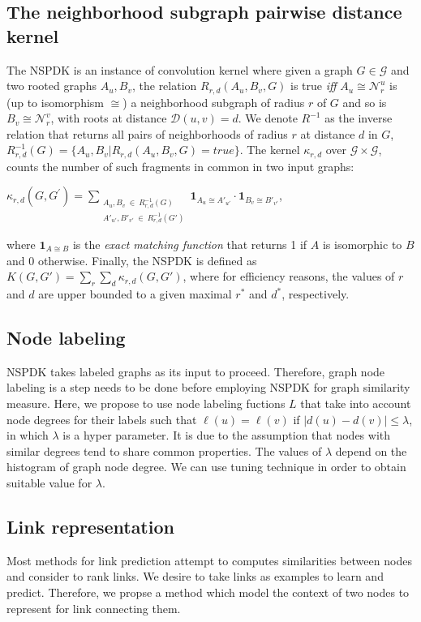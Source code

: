 \documentclass[runningheads,a4paper]{llncs}
\begin{document}
\subsection{The neighborhood subgraph pairwise distance kernel}
The NSPDK \cite{nspdk} is an instance of convolution kernel \cite{convolution-kernel} where given a graph $G \in \mathcal{G}$ and two rooted graphs $A_u, B_v$, the relation $R_{r,d}(A_u, B_v, G)$ is true {\em iff} $A_u \cong \mathcal{N}_r^u$ is (up to isomorphism $\cong$) a neighborhood subgraph of radius $r$ of $G$ and so is $B_v \cong  \mathcal{N}_r^v$, with roots at distance $\mathcal{D}(u,v)= d$. We denote $R^{-1}$ as the inverse relation that returns all pairs of neighborhoods of radius $r$ at distance $d$ in $G$, $R^{-1}_{r,d}(G) = \lbrace A_u, B_v | R_{r,d}(A_u,B_v,G)=true\rbrace$. The kernel $\kappa_{r,d}$ over $\mathcal{G} \times \mathcal{G}$, counts the number of such fragments in common in two input graphs: 
\begin{center}
$\kappa_{r,d}(G,G^{'}) = 
\!\!\!\!\!\!\!\!\!\!\!\! 
\sum\limits_{\substack{A_u, B_v \ \in \ R_{r,d}^{-1}(G) \\ 
{A'}_{u'}, {B'}_{v'} \ \in \ R_{r,d}^{-1}(G')
}} \!\!\!\!\!\!\!\!\!\!\!\!  { { \textbf{1}_{A_{u} \cong A'_{u'}}} \cdot {
\textbf{1}_{B_{v} \cong B'_{v'}}} }$, 
\end{center}
\noindent where $\textbf{1}_{A \cong B}$ is the \textit{exact matching function} that returns 1 if $A$ is
isomorphic to $B$ and 0 otherwise.  Finally, the NSPDK is defined as $K(G,G') = \sum\limits_{r}{\sum\limits_{d}{\kappa_{r,d}(G,G')}}$, where for efficiency reasons, the values of $r$ and $d$ are upper bounded to a given maximal $r^*$ and $d^*$, respectively.

\subsection{Node labeling}
NSPDK takes labeled graphs as its input to proceed. Therefore, graph node labeling is a step needs to be done before employing NSPDK for graph similarity measure. Here, we propose to use node labeling fuctions $L$ that take into account node degrees for their labels such that $\ell(u) = \ell(v)$ if $|d(u) - d(v)|\leq \lambda$, in which $\lambda$ is a hyper parameter. It is due to the assumption that nodes with similar degrees tend to share common properties. The values of $\lambda$ depend on the histogram of graph node degree. We can use tuning technique in order to obtain suitable value for $\lambda$.
\subsection{Link representation}
Most methods for link prediction attempt to computes similarities between nodes and consider to rank links. We desire to take links as examples to learn and predict. Therefore, we propse a method which model the context of two nodes to represent for link connecting them.
\end{document}
